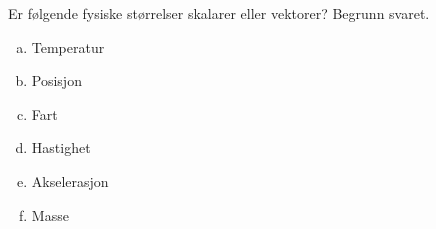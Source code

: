 %
Er følgende fysiske størrelser skalarer eller vektorer? Begrunn svaret.
\begin{enumerate}[a)]
    \item Temperatur
    \item Posisjon
    \item Fart
    \item Hastighet
    \item Akselerasjon
    \item Masse
\end{enumerate}
